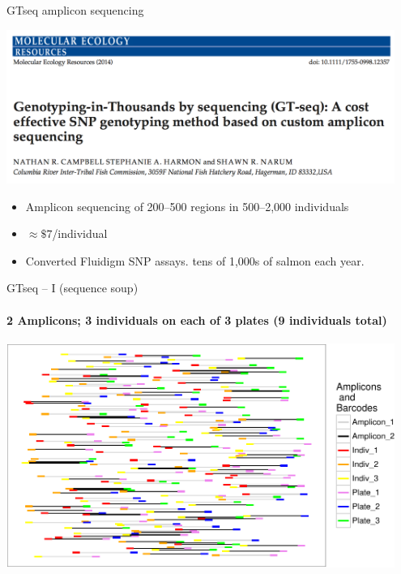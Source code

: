 \documentclass[letter,graphicx]{beamer}
\begin{document}
\begin{frame}{GTseq amplicon sequencing}
\begin{center}
\includegraphics[width=0.95\textwidth]{mhap_figs/gtseq-header.png}
\end{center}
\begin{itemize}
\item Amplicon sequencing of 200--500 regions in 500--2,000 individuals
\item $\approx \$7$/individual
\item Converted Fluidigm SNP assays.  tens of 1,000s of salmon each year.
\end{itemize}
\end{frame}








\begin{frame}{GTseq -- I (sequence soup)}
\framesubtitle{2 Amplicons; 3 individuals on each of 3 plates (9 individuals total)}
\begin{center}
\includegraphics[width=0.95\textwidth]{mhap_figs/gtseq-soup-crop.pdf}
\end{center}
\end{frame}
\end{document}

